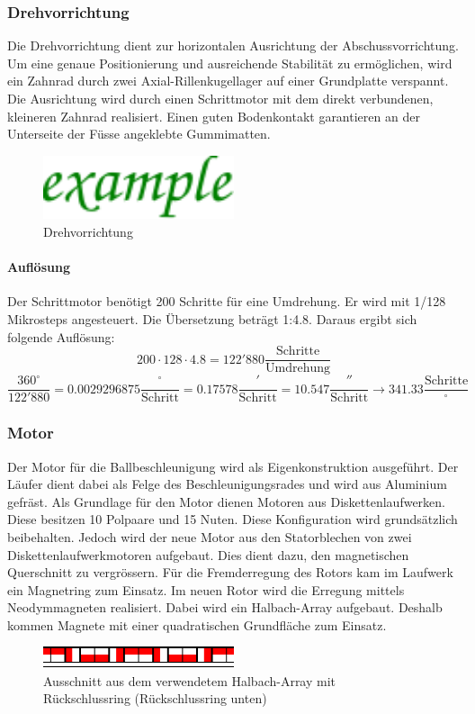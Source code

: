 \subsubsection{Drehvorrichtung}
Die Drehvorrichtung dient zur horizontalen Ausrichtung der 
Abschussvorrichtung. Um eine genaue Positionierung und ausreichende Stabilität 
zu ermöglichen, wird ein Zahnrad durch zwei Axial-Rillenkugellager auf einer 
Grundplatte verspannt. Die Ausrichtung wird durch einen Schrittmotor mit dem 
direkt verbundenen, kleineren Zahnrad realisiert. Einen guten Bodenkontakt 
garantieren an der Unterseite der Füsse angeklebte Gummimatten.

\begin{figure}[h!]
    \centering
    \includegraphics[width=0.5\textwidth]{../example/fig/example.pdf}
    \caption{Drehvorrichtung}
    \label{fig:drehvorrichtung}
\end{figure}

\paragraph{Auflösung}
Der Schrittmotor benötigt 200 Schritte für eine Umdrehung. Er wird mit 1/128 
Mikrosteps angesteuert. Die Übersetzung beträgt 1:4.8. Daraus ergibt sich 
folgende Auflösung: 
\[ 200 \cdot 128 \cdot 4.8 = 122'880 \frac{\text{Schritte}}{\text{Umdrehung}}  \]
\[ \frac{360^\circ}{122'880} = 0.0029296875 \frac{^\circ}{\text{Schritt}} 
= 0.17578 \frac{'}{\text{Schritt}} = 10.547 \frac{''}{\text{Schritt}}
\rightarrow 341.33 \frac{\text{Schritte}}{^\circ}\]

\subsubsection{Motor}
Der Motor für die Ballbeschleunigung wird als Eigenkonstruktion ausgeführt.  
Der Läufer dient dabei als Felge des Beschleunigungsrades und wird aus 
Aluminium gefräst. Als Grundlage für den Motor dienen Motoren aus 
Diskettenlaufwerken. Diese besitzen 10 Polpaare und 15 Nuten. Diese 
Konfiguration wird grundsätzlich beibehalten. Jedoch wird der neue Motor aus 
den Statorblechen von zwei Diskettenlaufwerkmotoren aufgebaut. Dies dient 
dazu, den magnetischen Querschnitt zu vergrössern. Für die Fremderregung des 
Rotors kam im Laufwerk ein Magnetring zum Einsatz. Im neuen Rotor wird die 
Erregung mittels Neodymmagneten realisiert. Dabei wird ein Halbach-Array 
aufgebaut. Deshalb kommen Magnete mit einer quadratischen Grundfläche zum 
Einsatz. 
\begin{figure}[h!]
    \centering
    \includegraphics[width=0.5\textwidth]{fig/halbach.pdf}
    \caption{Ausschnitt aus dem verwendetem Halbach-Array mit Rückschlussring (Rückschlussring unten)}
    \label{fig:halbach}
\end{figure}


